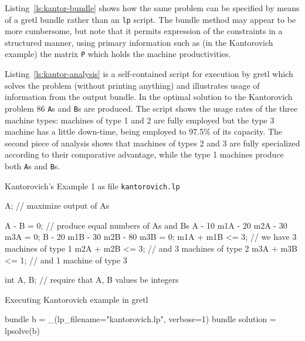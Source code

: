 \documentclass{article}
\begin{document}
Listing~\ref{ls:kantor-bundle} shows how the same problem can be
specified by means of a gretl bundle rather than an \texttt{lp}
script. The bundle method may appear to be more cumbersome, but note
that it permits expression of the constraints in a structured manner,
using primary information such as (in the Kantorovich example) the
matrix \texttt{P} which holds the machine productivities.

Listing~\ref{ls:kantor-analysis} is a self-contained script for
execution by gretl which solves the problem (without printing
anything) and illustrates usage of information from the output
bundle. In the optimal solution to the Kantorovich problem 86
\texttt{A}s and \texttt{B}s are produced. The script shows the usage
rates of the three machine types: machines of type 1 and 2 are fully
employed but the type 3 machine has a little down-time, being employed
to 97.5\% of its capacity. The second piece of analysis shows that
machines of types 2 and 3 are fully specialized according to their
comparative advantage, while the type 1 machines produce both
\texttt{A}s and \texttt{B}s.


\begin{script}[htbp]
  \caption{Kantorovich's Example 1 as file \texttt{kantorovich.lp}}
  \label{ls:kantor-lp}
\begin{scode}
A; // maximize output of As

A - B = 0; // produce equal numbers of As and Bs
A - 10 m1A - 20 m2A - 30 m3A = 0;
B - 20 m1B - 30 m2B - 80 m3B = 0;
m1A + m1B <= 3; // we have 3 machines of type 1
m2A + m2B <= 3; // and 3 machines of type 2
m3A + m3B <= 1; // and 1 machine of type 3

int A, B; // require that A, B values be integers
\end{scode}
\end{script}

\begin{script}[htbp]
  \caption{Executing Kantorovich example in gretl}
  \label{ls:kantor-inp}
\begin{scode}
bundle b = _(lp_filename="kantorovich.lp", verbose=1)
bundle solution = lpsolve(b)
\end{scode}
\end{script}
\end{document}
